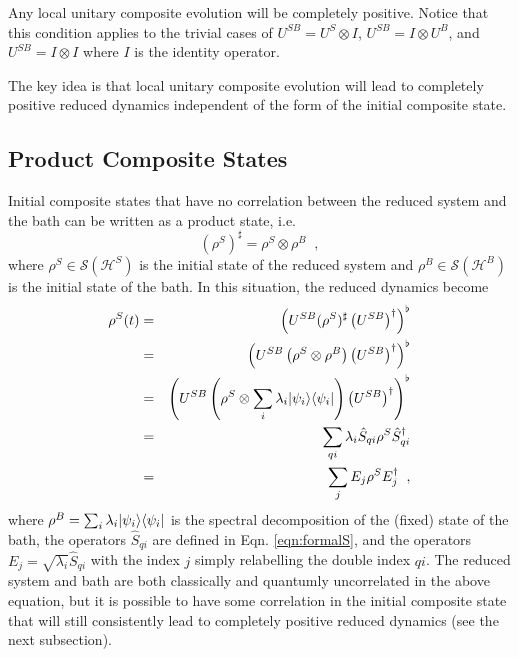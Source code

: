 Any local unitary composite evolution will be completely positive.  Notice that this condition applies to the trivial cases of $U^{SB} = U^S \otimes I$, $U^{SB} = I\otimes U^B$, and $U^{SB} = I\otimes I$ where $I$ is the identity operator. 

The key idea is that local unitary composite evolution will lead to completely positive reduced dynamics independent of the form of the initial composite state. 

\subsection{Product Composite States}
\label{sec:prodstates}
Initial composite states that have no correlation between the reduced system and the bath can be written as a product state, i.e.\
\begin{equation*}
(\rho^S)^\sharp = \rho^S \otimes \rho^B\;\;,
\end{equation*}
where $\rho^S\in\mathcal{S}(\mathcal{H}^S)$ is the initial state of the reduced system and $\rho^B\in\mathcal{S}(\mathcal{H}^B)$ is the initial state of the bath.  In this situation, the reduced dynamics become
\begin{eqnarray*}
\rho^S(t) &=& \left(U^{SB}(\rho^{S})^\sharp\left(U^{SB}\right)^\dagger\right)^\flat\\
&=&\left(U^{SB}\left(\rho^S\otimes\rho^B\right)\left(U^{SB}\right)^\dagger\right)^\flat\\
&=& \left(U^{SB}\left(\rho^S\otimes\sum_i \lambda_i |\psi_i\rangle\langle\psi_i|\right)\left(U^{SB}\right)^\dagger\right)^\flat\\
&=& \sum_{qi} \lambda_i \hat{S}_{qi} \rho^S \hat{S}^\dagger_{qi}\\
&=& \sum_j E_j \rho^S E_j^\dagger\;\;,
\end{eqnarray*}
where $\rho^B=\sum_i \lambda_i |\psi_i\rangle\langle\psi_i|$ is the spectral decomposition of the (fixed) state of the bath, the operators $\hat{S}_{qi}$ are defined in Eqn. \ref{eqn:formalS}, and the operators $E_j=\sqrt{\lambda_i}\hat{S}_{qi}$ with the index $j$ simply relabelling the double index $qi$.  The reduced system and bath are both classically and quantumly uncorrelated in the above equation, but it is possible to have some correlation in the initial composite state that will still consistently lead to completely positive reduced dynamics (see the next subsection).

